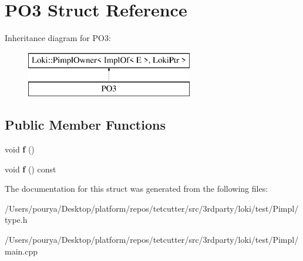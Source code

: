 \hypertarget{structPO3}{}\section{P\+O3 Struct Reference}
\label{structPO3}
Inheritance diagram for P\+O3\+:\begin{figure}[H]
\begin{center}
\leavevmode
\includegraphics[height=2.000000cm]{structPO3}
\end{center}
\end{figure}
\subsection*{Public Member Functions}
\begin{DoxyCompactItemize}
\item 
\hypertarget{structPO3_aef5f033bfe22cc70fc7f302df7b8ad01}{}void {\bfseries f} ()\label{structPO3_aef5f033bfe22cc70fc7f302df7b8ad01}

\item 
\hypertarget{structPO3_ad11b6188338c4990fb698242195bd5d5}{}void {\bfseries f} () const \label{structPO3_ad11b6188338c4990fb698242195bd5d5}

\end{DoxyCompactItemize}


The documentation for this struct was generated from the following files\+:\begin{DoxyCompactItemize}
\item 
/\+Users/pourya/\+Desktop/platform/repos/tetcutter/src/3rdparty/loki/test/\+Pimpl/type.\+h\item 
/\+Users/pourya/\+Desktop/platform/repos/tetcutter/src/3rdparty/loki/test/\+Pimpl/main.\+cpp\end{DoxyCompactItemize}
